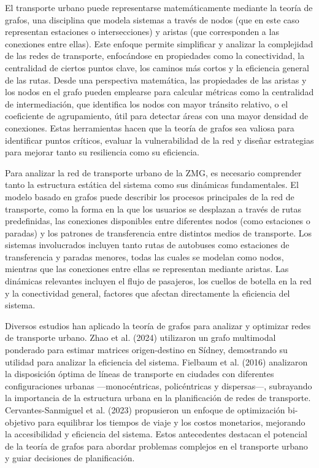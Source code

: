 \documentclass[12pt,oneside]{article}
\begin{document}
El transporte urbano puede representarse matemáticamente mediante la teoría de grafos, una disciplina que modela sistemas a través de nodos (que en este caso representan estaciones o intersecciones) y aristas (que corresponden a las conexiones entre ellas). Este enfoque permite simplificar y analizar la complejidad de las redes de transporte, enfocándose en propiedades como la conectividad, la centralidad de ciertos puntos clave, los caminos más cortos y la eficiencia general de las rutas. Desde una perspectiva matemática, las propiedades de las aristas y los nodos en el grafo pueden emplearse para calcular métricas como la centralidad de intermediación, que identifica los nodos con mayor tránsito relativo, o el coeficiente de agrupamiento, útil para detectar áreas con una mayor densidad de conexiones. Estas herramientas hacen que la teoría de grafos sea valiosa para identificar puntos críticos, evaluar la vulnerabilidad de la red y diseñar estrategias para mejorar tanto su resiliencia como su eficiencia.

Para analizar la red de transporte urbano de la ZMG, es necesario comprender tanto la estructura estática del sistema como sus dinámicas fundamentales. El modelo basado en grafos puede describir los procesos principales de la red de transporte, como la forma en la que los usuarios se desplazan a través de rutas predefinidas, las conexiones disponibles entre diferentes nodos (como estaciones o paradas) y los patrones de transferencia entre distintos medios de transporte. Los sistemas involucrados incluyen tanto rutas de autobuses como estaciones de transferencia y paradas menores, todas las cuales se modelan como nodos, mientras que las conexiones entre ellas se representan mediante aristas. Las dinámicas relevantes incluyen el flujo de pasajeros, los cuellos de botella en la red y la conectividad general, factores que afectan directamente la eficiencia del sistema.

Diversos estudios han aplicado la teoría de grafos para analizar y optimizar redes de transporte urbano. Zhao et al. (2024) utilizaron un grafo multimodal ponderado para estimar matrices origen-destino en Sídney, demostrando su utilidad para analizar la eficiencia del sistema. Fielbaum et al. (2016) analizaron la disposición óptima de líneas de transporte en ciudades con diferentes configuraciones urbanas —monocéntricas, policéntricas y dispersas—, subrayando la importancia de la estructura urbana en la planificación de redes de transporte. Cervantes-Sanmiguel et al. (2023) propusieron un enfoque de optimización bi-objetivo para equilibrar los tiempos de viaje y los costos monetarios, mejorando la accesibilidad y eficiencia del sistema. Estos antecedentes destacan el potencial de la teoría de grafos para abordar problemas complejos en el transporte urbano y guiar decisiones de planificación.
\end{document}
